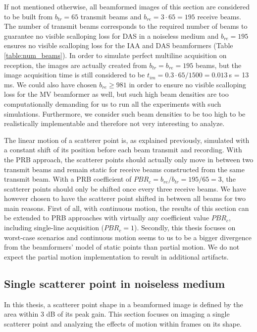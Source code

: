 If not mentioned otherwise, all beamformed images of this section are considered to be built from $b_{tr} = 65$ transmit beams and $b_{re} = 3 \cdot 65 = 195$ receive beams. The number of transmit beams corresponds to the required number of beams to guarantee no visible scalloping loss for DAS in a noiseless medium and $b_{re} = 195$ ensures no visible scalloping loss for the IAA and DAS beamformers (Table \ref{table:num_beams}).
In order to simulate perfect multiline acquisition on reception, the images are actually created from $b_{tr} = b_{re} = 195$ beams, but the image acquisition time is still considered to be $t_{im} = 0.3 \cdot 65 / 1500 = 0.013~$s = 13 ms.
We could also have chosen $b_{re} \geq 981$ in order to ensure no visible scalloping loss for the MV beamformer as well, but 
such high beam densities are too computationally demanding for us to run all the experiments with such simulations.
Furthermore, we consider such beam densities to be too high to be realistically implementable and therefore not very interesting to analyze.

The linear motion of a scatterer point is, as explained previously, simulated with a constant shift of its position before each beam transmit and recording. With the PRB approach, the scatterer points should actually only move in between two transmit beams and remain static for receive beams constructed from the same transmit beam. With a PRB coefficient of $PBR_c = b_{re} / b_{tr} = 195 / 65 = 3$, the scatterer points should only be shifted once every three receive beams.
We have however chosen to have the scatterer point shifted in between all beams for two main reasons.
First of all, with continuous motion, the results of this section can be extended to PRB approaches with virtually any coefficient value $PBR_c$, including single-line acquisition ($PBR_c = 1$). Secondly, this thesis focuses on worst-case scenarios and continuous motion seems to us to be a bigger divergence from the beamformers' model of static points than partial motion. We do not expect the partial motion implementation to result in additional artifacts.


\subsection{Single scatterer point in noiseless medium}
\label{sec:single_noiseless}
In this thesis, a scatterer point shape in a beamformed image is defined by the area within 3 dB of its peak gain. This section focuses on imaging a single scatterer point and analyzing the effects of motion within frames on its shape.

